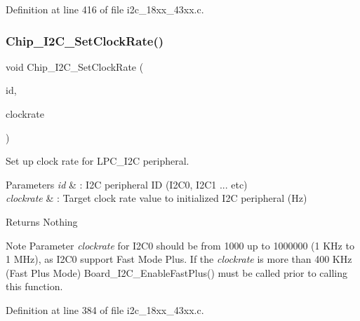 Definition at line 416 of file i2c\+\_\+18xx\+\_\+43xx.\+c.

\mbox{\label{group___i2_c__18_x_x__43_x_x_ga17fac5d72058db8eed11d247e78b74ed}} 
\subsubsection{\texorpdfstring{Chip\+\_\+\+I2\+C\+\_\+\+Set\+Clock\+Rate()}{Chip\_I2C\_SetClockRate()}}
{\footnotesize\ttfamily void Chip\+\_\+\+I2\+C\+\_\+\+Set\+Clock\+Rate (\begin{DoxyParamCaption}\item[{\hyperlink{group___i2_c__18_x_x__43_x_x_ga957556a4d900506cd4cba8427afd81e6}{I2\+C\+\_\+\+I\+D\+\_\+T}}]{id,  }\item[{uint32\+\_\+t}]{clockrate }\end{DoxyParamCaption})}



Set up clock rate for L\+P\+C\+\_\+\+I2C peripheral. 


\begin{DoxyParams}{Parameters}
{\em id} & \+: I2C peripheral ID (I2\+C0, I2\+C1 ... etc) \\
\hline
{\em clockrate} & \+: Target clock rate value to initialized I2C peripheral (Hz) \\
\hline
\end{DoxyParams}
\begin{DoxyReturn}{Returns}
Nothing 
\end{DoxyReturn}
\begin{DoxyNote}{Note}
Parameter {\itshape clockrate} for I2\+C0 should be from 1000 up to 1000000 (1 K\+Hz to 1 M\+Hz), as I2\+C0 support Fast Mode Plus. If the {\itshape clockrate} is more than 400 K\+Hz (Fast Plus Mode) Board\+\_\+\+I2\+C\+\_\+\+Enable\+Fast\+Plus() must be called prior to calling this function. 
\end{DoxyNote}


Definition at line 384 of file i2c\+\_\+18xx\+\_\+43xx.\+c.

\mbox{\label{group___i2_c__18_x_x__43_x_x_ga1fc3fc0946344e9551d9eef0bbf610b9}} 
